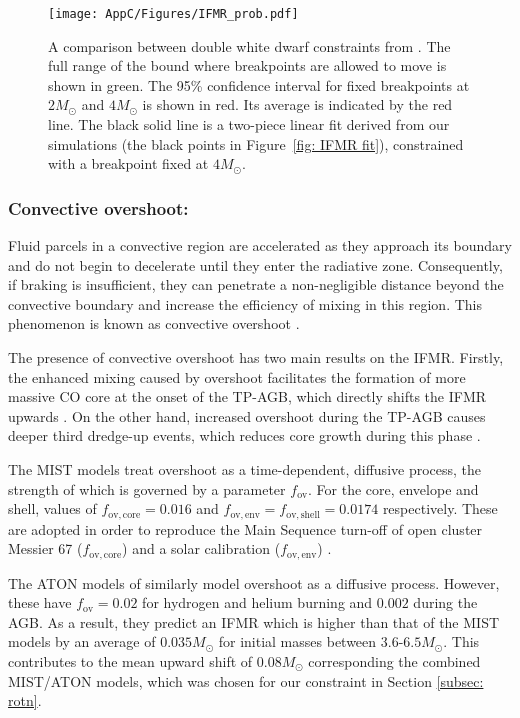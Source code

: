 \begin{figure}[t]
    \centering
    \texttt{[image: AppC/Figures/IFMR\_prob.pdf]}
    \caption{A comparison between double white dwarf constraints from \cite{Andrews}. The full range of the bound where breakpoints are allowed to move is shown in green. The 95\% confidence interval for fixed breakpoints at $2M_{\odot}$ and $4M_{\odot}$ is shown in red. Its average is indicated by the red line. The black solid line is a two-piece linear fit derived from our simulations (the black points in Figure~\ref{fig: IFMR fit}), constrained with a breakpoint fixed at $4M_{\odot}$. }
    \label{fig: IFMR prob}
\end{figure}


\subsubsection*{Convective overshoot:}
Fluid parcels in a convective region are accelerated as they approach its boundary and do not begin to decelerate until they enter the radiative zone. Consequently, if braking is insufficient, they can penetrate a non-negligible distance beyond the convective boundary and increase the efficiency of mixing in this region. This phenomenon is known as convective overshoot \cite{2012sse..book.....K}.


The presence of convective overshoot has two main results on the IFMR. Firstly, the enhanced mixing caused by overshoot facilitates the formation of more massive CO core at the onset of the TP-AGB, which directly shifts the IFMR upwards \cite{2000A&A...360..952H}. On the other hand, increased overshoot during the TP-AGB causes deeper third dredge-up events, which reduces core growth during this phase \cite{2000A&A...360..952H, Cummings_2019}.




The MIST models treat overshoot as a time-dependent, diffusive process, the strength of which is governed by a parameter $f_{\mathrm{ov}}$. For the core, envelope and shell, values of $f_{\mathrm{ov, core}}=0.016$ and $f_{\mathrm{ov, env}}=f_{\mathrm{ov, shell}}=0.0174$ respectively. These are adopted in order to reproduce the Main Sequence turn-off of open cluster Messier 67 ($f_{\mathrm{ov, core}}$) and a solar calibration ($f_{\mathrm{ov, env}}$) \cite{MIST1}. 


The ATON models of \cite{ATON} similarly model overshoot as a diffusive process. However, these have $f_{\mathrm{ov}}=0.02$ for hydrogen and helium burning and $0.002$ during the AGB. As a result, they predict an IFMR which is higher than that of the MIST models by an average of $0.035M_{\odot}$ for initial masses between $3.6$-$6.5M_{\odot}$. This contributes to the mean upward shift of $0.08M_{\odot}$ corresponding the combined MIST/ATON models, which was chosen for our constraint in Section \ref{subsec: rotn}.

